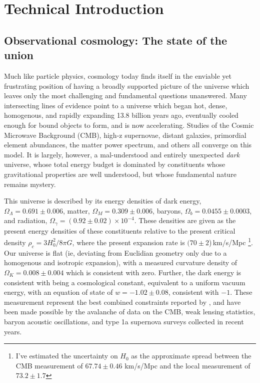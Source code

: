 \chapter{Technical Introduction}

\section{Observational cosmology: The state of the union}

Much like particle physics, cosmology today finds itself in the enviable yet frustrating position of having a broadly supported picture of the universe which leaves only the most challenging and fundamental questions  unanswered. Many intersecting lines of evidence point to a universe which began hot, dense, homogenous, and rapidly expanding 13.8 billion years ago, eventually cooled enough for bound objects to form, and is now accelerating. Studies of the Cosmic Microwave Background (CMB), high-z supernovae, distant galaxies, primordial element abundances, the matter power spectrum, and others all converge on this model. It is largely, however, a mal-understood and entirely unexpected \textit{dark} universe, whose total energy budget is dominated by constituents whose gravitational properties are well understood, but whose fundamental nature remains mystery. 

This universe is described by its energy densities of dark energy, $\Omega_\Lambda=0.691\pm0.006$, matter, $\Omega_M=0.309\pm0.006$, baryons, $\Omega_b=0.0455\pm0.0003$, and radiation, $\Omega_\gamma=(0.92\pm0.02)\times10^{-4}$. These densities are given as the present energy densities of these constituents relative to the present critical density $\rho_c=3H_0^2/8\pi G$, where the present expansion rate is $(70\pm2$)\,km/s/Mpc \footnote{I've estimated the uncertainty on $H_0$ as the approximate spread between the CMB measurement of $67.74\pm0.46$ km/s/Mpc and the local measurement of $73.2\pm1.7$}. Our universe is flat (ie, deviating from Euclidian geometry only due to a homogenous and isotropic expansion), with a measured curvature density of $\Omega_K=0.008\pm0.004$ which is consistent with zero. Further, the dark energy is consistent with being a cosmological constant, equivalent to a uniform vacuum energy, with an equation of state of $w=-1.02\pm0.08$, consistent with $-1$. These measurement represent the best combined constraints reported by \citet{planck16}, and have been made possible by the avalanche of data on the CMB, weak lensing statistics, baryon acoustic oscillations, and type 1a supernova surveys collected in recent years. 

